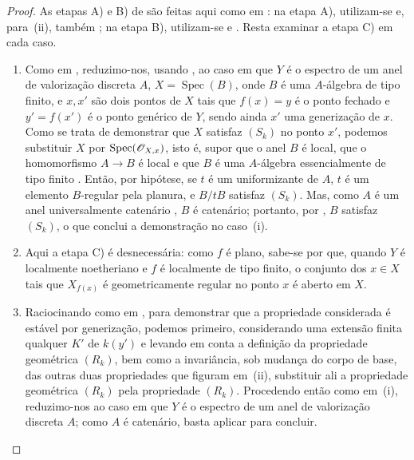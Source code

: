 \begin{proof}
As etapas A) e B) de  são feitas aqui
como em : na etapa A), utilizam-se
 e, para~(ii), também
; na etapa B), utilizam-se
 e . Resta examinar
a etapa C) em cada caso.
\begin{enumerate}[label=(\roman*)]
\item[(i)] Como em , reduzimo-nos,
usando , ao caso em que $Y$ é o
espectro de um anel de valorização discreta $A$,
$X=\operatorname{Spec}(B)$, onde $B$ é uma
$A$-álgebra de tipo finito, e $x,x'$ são dois pontos
de $X$ tais que $f(x)=y$ é o ponto fechado e
$y'=f(x')$ é o ponto genérico de $Y$, sendo ainda
$x'$ uma generização de $x$. Como se trata de
demonstrar que $X$ satisfaz $(S_k)$ no ponto $x'$,
podemos substituir $X$ por
$\operatorname{Spec}(\mathscr{O}_{X,x})$, isto é, supor
que o anel $B$ é local, que o homomorfismo
$A\to B$ é local e que $B$ é uma $A$-álgebra
essencialmente de tipo finito .
Então, por hipótese, se $t$ é um uniformizante
de $A$, $t$ é um elemento $B$-regular pela
planura, e $B/tB$ satisfaz $(S_k)$. Mas, como
$A$ é um anel universalmente catenário
, $B$ é catenário; portanto,
por , $B$ satisfaz $(S_k)$,
o que conclui a demonstração no caso~(i).

\item[(iii)] Aqui a etapa C) é desnecessária:
como $f$ é plano, sabe-se por 
que, quando $Y$ é localmente noetheriano e $f$
é localmente de tipo finito, o conjunto dos
$x\in X$ tais que $X_{f(x)}$ é geometricamente
regular no ponto $x$ é aberto em $X$.

\item[(ii)] Raciocinando como em
, para demonstrar que a
propriedade considerada é estável por
generização, podemos primeiro, considerando
uma extensão finita qualquer $K'$ de $k(y')$
e levando em conta a definição
 da propriedade geométrica
$(R_k)$, bem como a invariância, sob mudança
do corpo de base, das outras duas propriedades
que figuram em~(ii), substituir ali a
propriedade geométrica $(R_k)$ pela propriedade
$(R_k)$. Procedendo então como em~(i),
reduzimo-nos ao caso em que $Y$ é o espectro
de um anel de valorização discreta $A$; como
$A$ é catenário, basta aplicar
 para concluir.


\end{enumerate}
\end{proof}
